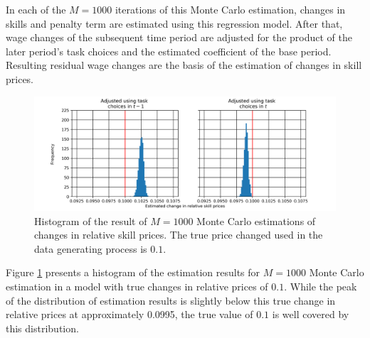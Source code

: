\documentclass[../main.tex]{subfiles}
\begin{document}
In each of the $M=1000$ iterations of this Monte Carlo estimation, changes in skills and penalty term are estimated using this regression model. After that, wage changes of the subsequent time period are adjusted for the product of the later period's task choices and the estimated coefficient of the base period. Resulting residual wage changes are the basis of the estimation of changes in skill prices.
\\
\begin{figure}[!htbp]
	\centering
	\includegraphics[scale=0.75]{../FIG/MC_estimation_rslt.png} 
	\caption{Histogram of the result of $M=1000$ Monte Carlo estimations of changes in relative skill prices. The true price changed used in the data generating process is $0.1$.}
	\label{fig:MC_est_rslt}
\end{figure}
Figure \ref{fig:MC_est_rslt} presents a histogram of the estimation results for $M=1000$ Monte Carlo estimation in a model with true changes in relative prices of $0.1$. While the peak of the distribution of estimation results is slightly below this true change in relative prices at approximately 0.0995, the true value of $0.1$ is well covered by this distribution.
\end{document}
